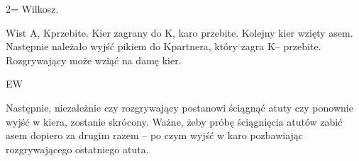 \documentclass[12pt, a4paper]{article}
\begin{document}
2\diams = Wilkosz. 

Wist A\diams, K\diams przebite. Kier zagrany do K\hearts, karo przebite.
Kolejny kier wzięty asem. Następnie należało wyjść pikiem do K\spades partnera, który
zagra K\spades -- przebite. Rozgrywający może wziąć na damę kier. 

        {}
        {}
        {}
        {EW}

Następnie, niezależnie
czy rozgrywający postanowi ściągnąć atuty czy ponownie wyjść w kiera, zostanie skrócony.
Ważne, żeby próbę ściągnięcia atutów zabić asem dopiero za drugim razem -- po czym
wyjść w karo pozbawiając rozgrywającego ostatniego atuta.





	
	

\end{document}
